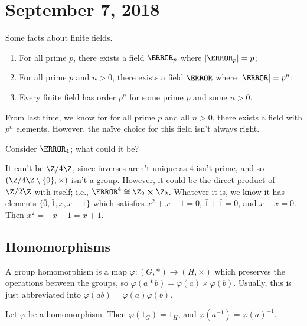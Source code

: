 \section{September 7, 2018}

Some facts about finite fields.
\begin{enumerate}
\item For all prime $p$, there exists a field $\F_p$ where $\abs{\F_p} = p$;
\item For all prime $p$ and $n > 0$, there exists a field $\F$ where $\abs{\F} = p^n$;
\item Every finite field has order $p^n$ for some prime $p$ and some $n > 0$.
\end{enumerate}

From last time, we know for for all prime $p$ and all $n > 0$, there exists a field with $p^n$ elements. However, the naïve choice for this field isn't always right.

\begin{example}
Consider $\F_4$; what could it be?
\end{example}

\begin{solution}
It can't be $\Z/4\Z$, since inverses aren't unique as $4$ isn't prime, and so $(\Z/4\Z \setminus \{0\}, \times)$ isn't a group. However, it could be the direct product of $\Z/2\Z$ with itself; i.e., $\F^4 \cong \Z_2 \cross \Z_2$. Whatever it is, we know it has elements $\{\bar{0},\bar{1}, x, x+1\}$ which satisfies $x^2 + x + 1 = 0$, $\bar{1} + \bar{1} = 0$, and $x + x = 0$. Then $x^2 = -x-1 = x+1$.
\end{solution}

\subsection{Homomorphisms}

\begin{definition}[Homomorphism]
A group homomorphism is a map $\varphi : (G, \ast) \to (H, \times)$ which preserves the operations between the groups, so $\varphi(a \ast b) = \varphi(a) \times \varphi(b)$. Usually, this is just abbreviated into $\varphi(ab) = \varphi(a)\varphi(b)$.
\end{definition}

\begin{lemma}
Let $\varphi$ be a homomorphism. Then $\varphi(1_G) = 1_H$, and $\varphi(a^{-1}) = \varphi(a)^{-1}$.
\end{lemma}

